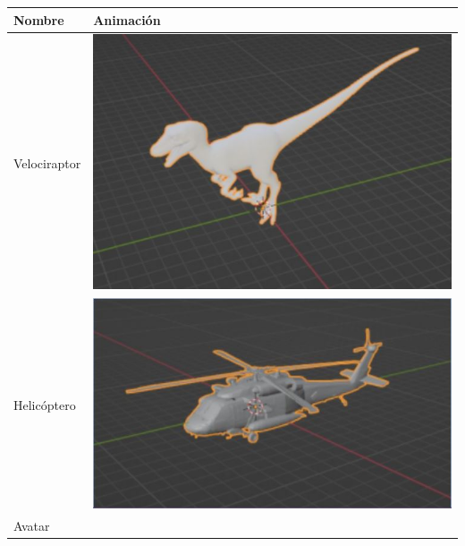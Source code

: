 \documentclass[12pt]{article} %
\begin{document}
	\begin{center}
		\begin{tabular}{ | m{19em} | m{19em} | }
			\hline
			Nombre & Animación  \\ 
		 	\hline
		 	Velociraptor &
		 	\includegraphics[scale=0.5]{images/Velociraptor.JPG} \\  
		 	\hline
		 	Helicóptero &
		 	\includegraphics[scale=0.5]{images/Helicoptero.JPG} \\  
			\hline
		 	Avatar &

\end{tabular}
\end{center}
\end{document}
